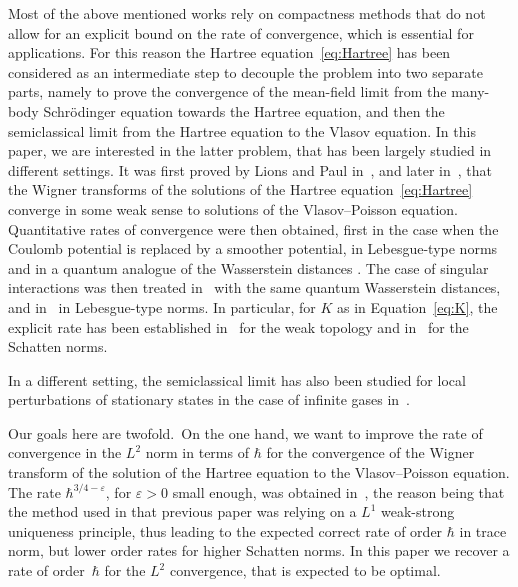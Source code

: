 \documentclass[11pt]{article}
\theoremstyle{definition}
\renewcommand {\(} {\lt(}
\renewcommand {\)} {\rt)}
\let\eps\varepsilon
\begin{document}
Most of the above mentioned works rely on compactness methods that do not allow for an explicit bound on the rate of convergence, which is essential for applications. For this reason the Hartree equation~\eqref{eq:Hartree} has been considered as an intermediate step to decouple the problem into two separate parts, namely to prove the convergence of the mean-field limit from the many-body Schrödinger equation towards the Hartree equation, and then the semiclassical limit from the Hartree equation to the Vlasov equation. In this paper, we are interested in the latter problem, that has been largely studied in different settings. It was first proved by Lions and Paul in~\cite{lions_sur_1993}, and later in~\cite{markowich_classical_1993,figalli_semiclassical_2012}, that the Wigner transforms of the solutions of the Hartree equation~\eqref{eq:Hartree} converge in some weak sense to solutions of the Vlasov--Poisson equation. Quantitative rates of convergence were then obtained, first in the case when the Coulomb potential is replaced by a smoother potential, in Lebesgue-type norms~\cite{athanassoulis_strong_2011, amour_semiclassical_2013, benedikter_hartree_2016} and in a quantum analogue of the Wasserstein distances \cite{golse_schrodinger_2017}. The case of singular interactions was then treated in~\cite{lafleche_propagation_2019, lafleche_global_2021} with the same quantum Wasserstein distances, and in~\cite{saffirio_semiclassical_2019, saffirio_hartree_2020, lafleche_strong_2021} in Lebesgue-type norms. In particular, for $K$ as in Equation~\eqref{eq:K}, the explicit rate has been established in~\cite{lafleche_propagation_2019} for the weak topology and in~\cite{saffirio_hartree_2020, lafleche_strong_2021} for the Schatten norms.

In a different setting, the semiclassical limit has also been studied for local perturbations of stationary states in the case of infinite gases in~\cite{lewin_hartree_2020}.

Our goals here are twofold.~On the one hand, we want to improve the rate of convergence in the $L^2$ norm in terms of $\hbar$ for the convergence of the Wigner transform of the solution of the Hartree equation to the Vlasov--Poisson equation. The rate $\hbar^{3/4-\eps}$, for $\eps>0$ small enough, was obtained in~\cite{lafleche_strong_2021}, the reason being that the method used in that previous paper was relying on a $L^1$ weak-strong uniqueness principle, thus leading to the expected correct rate of order $\hbar$ in trace norm, but lower order rates for higher Schatten norms. In this paper we recover a rate of order~$\hbar$ for the $L^2$ convergence, that is expected to be optimal.
\end{document}
